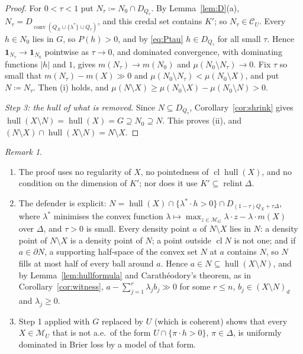 \documentclass[11pt]{article}
\newcommand{\M}{\mathcal{M}}
\newcommand{\CC}{\mathcal{C}}
\newcommand{\hull}{\operatorname{hull}}
\DeclareMathOperator{\conv}{conv}
\DeclareMathOperator{\relint}{relint}
\DeclareMathOperator{\cl}{cl}
\theoremstyle{plain}
\theoremstyle{definition}
\theoremstyle{remark}
\newtheorem{remark}[theorem]{Remark}
\begin{document}
\begin{proof}
For $0<\tau<1$ put $N_\tau\coloneqq N_0\cap D_{Q_\tau}$. By Lemma~\ref{lem:D}(a),
$N_\tau=D_{\conv(Q_X\cup\{\lambda^\ast\}\cup Q_\tau)}$, and this credal set contains $K'$;
so $N_\tau\in\CC_U$. Every $h\in N_0$ lies in $G$, so $P(h)>0$, and by \eqref{eq:Ptau}
$h\in D_{Q_\tau}$ for all small $\tau$. Hence $\mathbf 1_{N_\tau}\to\mathbf 1_{N_0}$
pointwise as $\tau\to0$, and dominated convergence, with dominating functions $|h|$ and
$1$, gives $m(N_\tau)\to m(N_0)$ and $\mu(N_0\setminus N_\tau)\to0$. Fix $\tau$ so small
that $m(N_\tau)-m(X)\gg0$ and $\mu(N_0\setminus N_\tau)<\mu(N_0\setminus X)$, and put
$N\coloneqq N_\tau$. Then (i) holds, and $\mu(N\setminus X)\ge\mu(N_0\setminus X)-
\mu(N_0\setminus N)>0$.

\emph{Step 3: the hull of what is removed.} Since $N\subseteq D_{Q_\tau}$,
Corollary~\ref{cor:shrink} gives $\hull(X\setminus N)=\hull(X)=G\supseteq N_0\supseteq
N$. This proves (ii), and $(N\setminus X)\cap\hull(X\setminus N)=N\setminus X$.
\end{proof}

\begin{remark}\label{rem:H}
\begin{enumerate}[label=(\alph*)]
  \item The proof uses no regularity of $X$, no pointedness of $\cl\hull(X)$, and no
  condition on the dimension of $K'$; nor does it use $K'\subseteq\relint\Delta$.
  \item The defender is explicit: $N=\hull(X)\cap\{\lambda^\ast\cdot h>0\}\cap
  D_{(1-\tau)Q_X+\tau\Delta}$, where $\lambda^\ast$ minimises the convex function
  $\lambda\mapsto\max_{z\in\M_G}\lambda\cdot z-\lambda\cdot m(X)$ over $\Delta$, and
  $\tau>0$ is small. Every density point $a$ of $N\setminus X$ lies in $N$: a density
  point of $N\setminus X$ is a density point of $N$; a point outside $\cl N$ is not one;
  and if $a\in\partial N$, a supporting half-space of the convex set $N$ at $a$ contains
  $N$, so $N$ fills at most half of every ball around $a$. Hence $a\in N\subseteq
  \hull(X\setminus N)$, and by Lemma~\ref{lem:hullformula} and Carath\'eodory's theorem,
  as in Corollary~\ref{cor:witness}, $a-\sum_{j=1}^r\lambda_jb_j\gg0$ for some $r\le n$,
  $b_j\in(X\setminus N)_d$ and $\lambda_j\ge0$.
  \item Step 1 applied with $G$ replaced by $U$ (which is coherent) shows that every
  $X\in\M_U$ that is not a.e.\ of the form $U\cap\{\pi\cdot h>0\}$, $\pi\in\Delta$, is
  uniformly dominated in Brier loss by a model of that form.
\end{enumerate}
\end{remark}
\end{document}
